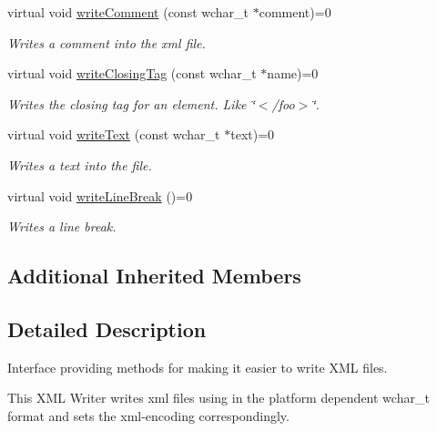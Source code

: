 \begin{DoxyCompactItemize}
virtual void \hyperlink{classirr_1_1io_1_1IXMLWriter_af6de322540d69764bd33a384763babd1}{write\+Comment} (const wchar\+\_\+t $\ast$comment)=0
\begin{DoxyCompactList}\small\item\em Writes a comment into the xml file. \end{DoxyCompactList}\item 
\mbox{\label{classirr_1_1io_1_1IXMLWriter_a904c931fe03455eee04fcf41ef519715}} 
virtual void \hyperlink{classirr_1_1io_1_1IXMLWriter_a904c931fe03455eee04fcf41ef519715}{write\+Closing\+Tag} (const wchar\+\_\+t $\ast$name)=0
\begin{DoxyCompactList}\small\item\em Writes the closing tag for an element. Like \char`\"{}$<$/foo$>$\char`\"{}. \end{DoxyCompactList}\item 
virtual void \hyperlink{classirr_1_1io_1_1IXMLWriter_a321adae57bcf06aadd2dda57eba1e4a6}{write\+Text} (const wchar\+\_\+t $\ast$text)=0
\begin{DoxyCompactList}\small\item\em Writes a text into the file. \end{DoxyCompactList}\item 
\mbox{\label{classirr_1_1io_1_1IXMLWriter_a98d9b558d991211f77f6d3f2f68d30d2}} 
virtual void \hyperlink{classirr_1_1io_1_1IXMLWriter_a98d9b558d991211f77f6d3f2f68d30d2}{write\+Line\+Break} ()=0
\begin{DoxyCompactList}\small\item\em Writes a line break. \end{DoxyCompactList}\end{DoxyCompactItemize}
\subsection*{Additional Inherited Members}


\subsection{Detailed Description}
Interface providing methods for making it easier to write X\+ML files. 

This X\+ML Writer writes xml files using in the platform dependent wchar\+\_\+t format and sets the xml-\/encoding correspondingly. 

